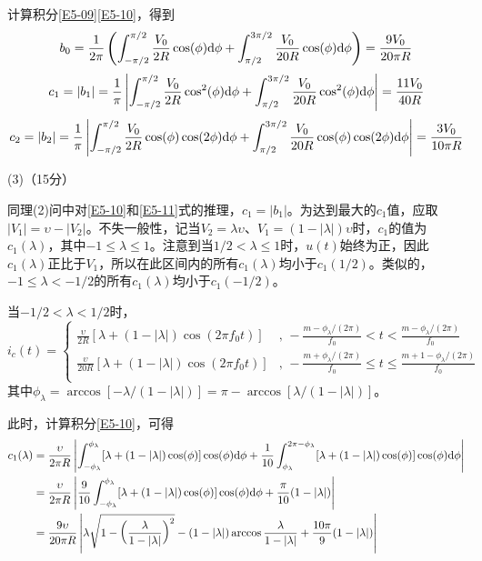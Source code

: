 \documentclass[10pt,a4paper,onecolumn,UTF8]{ctexart}
\begin{document}
	计算积分\eqref{E5-09}\eqref{E5-10}，得到
	\begin{equation}
		b_0=\frac{1}{2\pi}\left(\int_{-\pi/2}^{\pi/2}\frac{V_0}{2R}\cos(\phi)\mathrm{d}\phi+\int_{\pi/2}^{3\pi/2}\frac{V_0}{20R}\cos(\phi)\mathrm{d}\phi\right)=\frac{9V_0}{20\pi R}
	\end{equation}
	\begin{equation}
		c_1=|b_1|=\frac{1}{\pi}\left|\int_{-\pi/2}^{\pi/2}\frac{V_0}{2R}\cos^2(\phi)\mathrm{d}\phi+\int_{\pi/2}^{3\pi/2}\frac{V_0}{20R}\cos^2(\phi)\mathrm{d}\phi\right|=\frac{11V_0}{40R}
	\end{equation}
	\begin{equation}
		c_2=|b_2|=\frac{1}{\pi}\left|\int_{-\pi/2}^{\pi/2}\frac{V_0}{2R}\cos(\phi)\cos(2\phi)\mathrm{d}\phi+\int_{\pi/2}^{3\pi/2}\frac{V_0}{20R}\cos(\phi)\cos(2\phi)\mathrm{d}\phi\right|=\frac{3V_0}{10\pi R}
	\end{equation}
	
	(3)（15分）
	
	同理(2)问中对\eqref{E5-10}和\eqref{E5-11}式的推理，$c_1=|b_1|$。为达到最大的$c_1$值，应取$|V_1|=\upsilon-|V_2|$。不失一般性，记当$V_2=\lambda\upsilon$、$V_1=(1-|\lambda|)\upsilon$时，$c_1$的值为$c_1(\lambda)$，其中$-1\leq\lambda\leq1$。注意到当$1/2<\lambda\leq1$时，$u(t)$始终为正，因此$c_1(\lambda)$正比于$V_1$，所以在此区间内的所有$c_1(\lambda)$均小于$c_1(1/2)$。类似的，$-1\leq\lambda<-1/2$的所有$c_1(\lambda)$均小于$c_1(-1/2)$。
	
	当$-1/2<\lambda<1/2$时，
	\begin{equation}
		i_c(t)=\left\{\begin{aligned}
			\frac{\upsilon}{2R}[\lambda+(1-|\lambda|)\cos(2\pi f_0 t)]&,\,-\frac{m-\phi_{\lambda}/(2\pi)}{f_0}<t<\frac{m-\phi_{\lambda}/(2\pi)}{f_0}\\
			\frac{\upsilon}{20R}[\lambda+(1-|\lambda|)\cos(2\pi f_0 t)]&,\,-\frac{m+\phi_{\lambda}/(2\pi)}{f_0}\leq t\leq\frac{m+1-\phi_{\lambda}/(2\pi)}{f_0}\\
		\end{aligned}\right.
	\end{equation}
	其中$\phi_{\lambda}=\arccos[-\lambda/(1-|\lambda|)]=\pi-\arccos[\lambda/(1-|\lambda|)]$。
	
	此时，计算积分\eqref{E5-10}，可得
	\begin{equation}
		\begin{aligned}
			c_1(\lambda)&=\frac{\upsilon}{2\pi R}\left|\int_{-\phi_{\lambda}}^{\phi_{\lambda}}[\lambda+(1-|\lambda|)\cos(\phi)]\cos(\phi)\mathrm{d}\phi+\frac{1}{10}\int_{\phi_{\lambda}}^{2\pi-\phi_{\lambda}}[\lambda+(1-|\lambda|)\cos(\phi)]\cos(\phi)\mathrm{d}\phi\right|\\
			&=\frac{\upsilon}{2\pi R}\left|\frac{9}{10}\int_{-\phi_{\lambda}}^{\phi_{\lambda}}[\lambda+(1-|\lambda|)\cos(\phi)]\cos(\phi)\mathrm{d}\phi+\frac{\pi}{10}(1-|\lambda|)\right|\\
			&=\frac{9\upsilon}{20\pi R}\left|\lambda\sqrt{1-\left(\frac{\lambda}{1-|\lambda|}\right)^2}-(1-|\lambda|)\arccos\frac{\lambda}{1-|\lambda|}+\frac{10\pi}{9}(1-|\lambda|)\right|
		\end{aligned}
	\end{equation}
	
\end{document}
